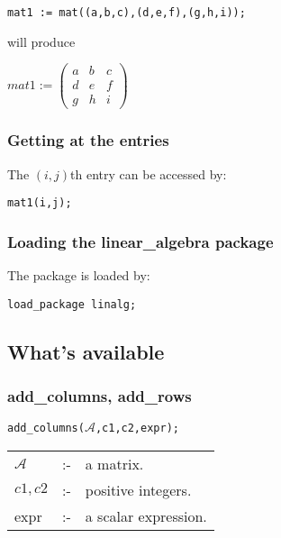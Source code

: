 {\tt mat1 := mat((a,b,c),(d,e,f),(g,h,i));}

will produce 

\begin{flushleft}
\begin{math}
mat1 := \left( \begin{array}{ccc} a & b & c \\ d & e & f \\ g & h & i
\end{array} \right)
\end{math}
\end{flushleft}

\subsubsection*{Getting at the entries}

The $(i,j)$th entry can be accessed by:

{\tt mat1(i,j);}

\subsubsection*{Loading the linear\_algebra package}

The package is loaded by:

{\tt load\_package linalg;}


\subsection{What's available}

\label{linalg:subsec3}

\subsubsection{add\_columns, add\_rows}
\label{linalg:add_columns}


\hspace*{0.175in} {\tt add\_columns($\mathcal{A}$,c1,c2,expr);} 

\hspace*{0.1in}
\begin{tabular}{l l l}
$\mathcal{A}$ & :- & a matrix. \\
$c1,c2$      & :- & positive integers. \\
expr       & :- & a scalar expression. 
\end{tabular}

